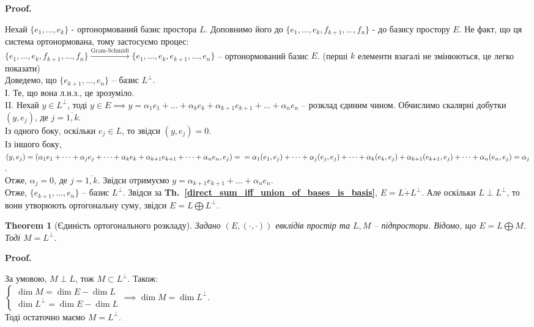 \documentclass[a4paper, 10pt]{article}
\makeatletter
\theoremstyle{theoremdd}
\newtheorem{theorem}{Theorem}[subsection]
\newcommand\thref[1]{\textbf{Th.~\ref{#1}}}
\renewenvironment{proof}[1][Proof.\\]{\par
\pushQED{\hfill \qed}%
\normalfont \topsep6\p@\@plus6\p@\relax
\trivlist
\item\relax
{\bfseries
#1\@addpunct{.}}\hspace\labelsep\ignorespaces
}{%
\popQED\endtrivlist\@endpefalse
}
\makeatother
\begin{document}
\begin{proof}
Нехай $\{e_1,\dots,e_k\}$ - ортонормований базис простора $L$. Доповнимо його до $\{e_1,\dots,e_k,f_{k+1},\dots,f_n\}$ - до базису простору $E$. Не факт, що ця система ортонормована, тому застосуємо процес:\\
$\{e_1,\dots,e_k,f_{k+1},\dots, f_n\} \xrightarrow{\text{Gram-Schmidt}} \{e_1,\dots,e_k, e_{k+1},\dots,e_n\}$ -- ортонормований базис $E$. (перші $k$ елементи взагалі не змінюються, це легко показати)\\
Доведемо, що $\{e_{k+1},\dots, e_n\}$ -- базис $L^\perp$.\\
І. Те, що вона л.н.з., це зрозуміло.\\
II. Нехай $y \in L^\perp$, тоді $y \in E \implies y = \alpha_1 e_1 + \dots + \alpha_k e_k + \alpha_{k+1} e_{k+1} + \dots + \alpha_n e_n$ -- розклад єдиним чином. Обчислимо скалярні добутки $(y,e_j)$, де $j=\overline{1,k}$.\\
Із одного боку, оскільки $e_j \in L$, то звідси $(y,e_j) = 0$.\\
Із іншого боку, $(y,e_j) = (\alpha_1 e_1 + \dots + \alpha_j e_j + \dots + \alpha_k e_k + \alpha_{k+1} e_{k+1} + \dots + \alpha_n e_n, e_j) = \\
= \alpha_1 (e_1,e_j) + \dots + \alpha_j (e_j,e_j) + \dots + \alpha_k (e_k,e_j) + \alpha_{k+1} (e_{k+1},e_j) + \dots + \alpha_n (e_n,e_j) = \alpha_j$.\\
Отже, $\alpha_j = 0$, де $j=\overline{1,k}$. Звідси отримуємо $y = \alpha_{k+1} e_{k+1} + \dots + \alpha_n e_n$.\\
Отже, $\{e_{k+1},\dots, e_n\}$ -- базис $L^\perp$. Звідси за \thref{direct_sum_iff_union_of_bases_is_basis}, $E= L \dot{+} L^{\perp}$. Але оскільки $L \perp L^\perp$, то вони утворюють ортогональну суму, звідси $E = L \bigoplus L^\perp$.
\end{proof}

\begin{theorem}[Єдиність ортогонального розкладу]
Задано $(E,(\cdot,\cdot))$  евклідів простір та $L,M$ -- підпростори. Відомо, що $E = L \bigoplus M$. Тоді $M = L^\perp$.
\end{theorem}

\begin{proof}
За умовою, $M \perp L$, тож $M \subset L^{\perp}$. Також:\\
$\begin{cases}
\dim M = \dim E - \dim L \\
\dim L^{\perp} = \dim E - \dim L
\end{cases} \implies \dim M = \dim L^\perp$.\\
Тоді остаточно маємо $M = L^\perp$.
\end{proof}
\end{document}
